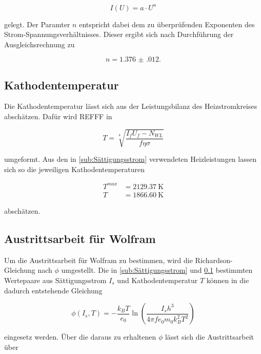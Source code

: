 \begin{equation}
    I(U)=a\cdot U^n
\end{equation}

gelegt. 
Der Paramter $n$ entspricht dabei dem zu überprüfenden Exponenten des Strom-Spannungsverhältnisses.
Dieser ergibt sich nach Durchführung der Ausgleichsrechnung zu 

\begin{equation*}
    n=\num{1.376(012)}.
\end{equation*}



\subsection{Kathodentemperatur}
\label{sub:Kathodentemperatur}

Die Kathodentemperatur lässt sich aus der Leistungsbilanz des Heizstromkreises abschätzen. Dafür wird REFFF in

\begin{equation}
    T=\sqrt[4]{\frac{I_fU_f-N_{WL}}{f\eta \sigma}}
\end{equation}

umgeformt. Aus den in \ref{sub:Sättigungsstrom} verwendeten Heizleistungen lassen sich so die jeweiligen Kathodentemperaturen

\begin{align*}
T^{max}&=\SI{2129.37}{\kelvin} \\
T&=\SI{1866.60}{\kelvin}
\end{align*}

abschätzen.


\subsection{Austrittsarbeit für Wolfram}

Um die Austrittsarbeit für Wolfram zu bestimmen, wird die Richardson-Gleichung nach $\phi$ umgestellt.
Die in \ref{sub:Sättigungsstrom} und  \ref{sub:Kathodentemperatur} bestimmten Wertepaare aus Sättigungsstrom $I_s$ und Kathodentemperatur $T$ können in die dadurch entstehende Gleichung

\begin{equation}
    \phi(I_s,T)=-\frac{k_BT}{e_0}\ln\left(\frac{I_sh^3}{4\pi f e_0 m_0 k_B^2 T^2}\right)
\end{equation} 

eingesetz werden. Über die daraus zu erhaltenen $\phi$ lässt sich die Austrittsarbeit über


